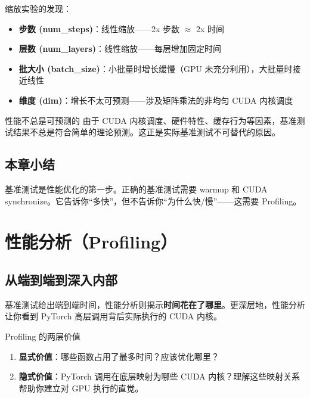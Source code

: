 \documentclass[a4paper]{article}
\begin{document}
缩放实验的发现：
\begin{itemize}
    \item \textbf{步数 (num\_steps)}：线性缩放——2x 步数 $\approx$ 2x 时间
    \item \textbf{层数 (num\_layers)}：线性缩放——每层增加固定时间
    \item \textbf{批大小 (batch\_size)}：小批量时增长缓慢（GPU 未充分利用），大批量时接近线性
    \item \textbf{维度 (dim)}：增长不太可预测——涉及矩阵乘法的非均匀 CUDA 内核调度
\end{itemize}

\begin{knowledgebox}{性能不总是可预测的}
由于 CUDA 内核调度、硬件特性、缓存行为等因素，基准测试结果不总是符合简单的理论预测。这正是实际基准测试不可替代的原因。
\end{knowledgebox}

\subsection{本章小结}

基准测试是性能优化的第一步。正确的基准测试需要 warmup 和 CUDA synchronize。它告诉你``多快''，但不告诉你``为什么快/慢''——这需要 Profiling。


\section{性能分析（Profiling）}

\subsection{从端到端到深入内部}

基准测试给出端到端时间，性能分析则揭示\textbf{时间花在了哪里}。更深层地，性能分析让你看到 PyTorch 高层调用背后实际执行的 CUDA 内核。

\begin{importantbox}{Profiling 的两层价值}
\begin{enumerate}
    \item \textbf{显式价值}：哪些函数占用了最多时间？应该优化哪里？
    \item \textbf{隐式价值}：PyTorch 调用在底层映射为哪些 CUDA 内核？理解这些映射关系帮助你建立对 GPU 执行的直觉。
\end{enumerate}
\end{importantbox}
\end{document}
